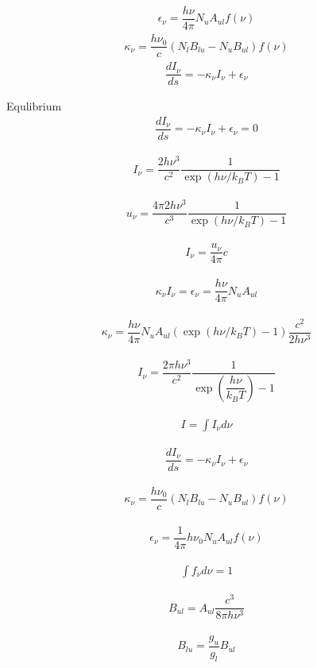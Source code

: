 \begin{align}
	\epsilon_{\nu} = \dfrac{h \nu}{4 \pi} N_u A_{ul} f(\nu)
\end{align}
\begin{align}
	\kappa_{\nu} = \dfrac{h \nu_0}{c} (N_l B_{lu} - N_u B_{ul}) f(\nu)
\end{align}
\begin{align}
	\dfrac{d I_{\nu}}{ds} = - \kappa_{\nu} I_{\nu} + \epsilon_{\nu}
\end{align}

Equlibrium
\begin{align}
	\dfrac{d I_{\nu}}{ds} = - \kappa_{\nu} I_{\nu} + \epsilon_{\nu} = 0
\end{align}

\begin{align}
	I_{\nu} = \dfrac{2 h \nu^3}{c^2}  \dfrac{1}{\exp(h \nu /  k_B T) - 1}
\end{align}

\begin{align}
	u_{\nu} = \dfrac{4 \pi 2 h \nu^3}{c^3}  \dfrac{1}{\exp(h \nu /  k_B T) - 1}
\end{align}

\begin{align}
	I_{\nu} = \dfrac{u_{\nu}}{4 \pi} c
\end{align}

\begin{align}
	\kappa_{\nu} I_{\nu} = \epsilon_{\nu} = \dfrac{h \nu}{4 \pi} N_u A_{ul}
\end{align}

\begin{align}
	\kappa_{\nu} = \dfrac{h \nu}{4 \pi} N_u A_{ul} (\exp(h \nu /  k_B T) - 1) \dfrac{c^2}{2 h \nu^3}
\end{align}


\begin{align}
	I_\nu = \dfrac{2 \pi h \nu^3}{c^2} \dfrac{1}{\exp\left(\dfrac{h \nu}{k_B T}\right) - 1}
\end{align}

\begin{align}
	I = \int I_{\nu} d\nu
\end{align}

\begin{align}
	\dfrac{d I_{\nu}}{ds} = - \kappa_\nu I_{\nu} + 	\epsilon_\nu
\end{align}

\begin{align}
	\kappa_\nu = \dfrac{h \nu_0}{c} \left(N_l B_{lu} - N_u B_{ul}\right) f(\nu)
\end{align}

\begin{align}
	\epsilon_\nu = \dfrac{1}{4 \pi} h \nu_0 N_u A_{ul}  f(\nu)
\end{align}

\begin{align}
	\int f_{\nu} d\nu = 1
\end{align}

\begin{align}
	B_{ul} = A_{ul} \dfrac{c^3}{8 \pi h \nu^3}
\end{align}

\begin{align}
	B_{lu} = \dfrac{g_u}{g_l} B_{ul}
\end{align}
